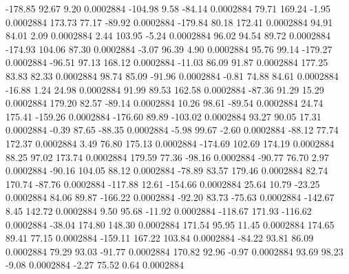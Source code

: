      -178.85       92.67        9.20     0.0002884
     -104.98        9.58      -84.14     0.0002884
       79.71      169.24       -1.95     0.0002884
      173.73       77.17      -89.92     0.0002884
     -179.84       80.18      172.41     0.0002884
       94.91       84.01        2.09     0.0002884
        2.44      103.95       -5.24     0.0002884
       96.02       94.54       89.72     0.0002884
     -174.93      104.06       87.30     0.0002884
       -3.07       96.39        4.90     0.0002884
       95.76       99.14     -179.27     0.0002884
      -96.51       97.13      168.12     0.0002884
      -11.03       86.09       91.87     0.0002884
      177.25       83.83       82.33     0.0002884
       98.74       85.09      -91.96     0.0002884
       -0.81       74.88       84.61     0.0002884
      -16.88        1.24       24.98     0.0002884
       91.99       89.53      162.58     0.0002884
      -87.36       91.29       15.29     0.0002884
      179.20       82.57      -89.14     0.0002884
       10.26       98.61      -89.54     0.0002884
       24.74      175.41     -159.26     0.0002884
     -176.60       89.89     -103.02     0.0002884
       93.27       90.05       17.31     0.0002884
       -0.39       87.65      -88.35     0.0002884
       -5.98       99.67       -2.60     0.0002884
      -88.12       77.74      172.37     0.0002884
        3.49       76.80      175.13     0.0002884
     -174.69      102.69      174.19     0.0002884
       88.25       97.02      173.74     0.0002884
      179.59       77.36      -98.16     0.0002884
      -90.77       76.70        2.97     0.0002884
      -90.16      104.05       88.12     0.0002884
      -78.89       83.57      179.46     0.0002884
       82.74      170.74      -87.76     0.0002884
     -117.88       12.61     -154.66     0.0002884
       25.64       10.79      -23.25     0.0002884
       84.06       89.87     -166.22     0.0002884
      -92.20       83.73      -75.63     0.0002884
     -142.67        8.45      142.72     0.0002884
        9.50       95.68      -11.92     0.0002884
     -118.67      171.93     -116.62     0.0002884
      -38.04      174.80      148.30     0.0002884
      171.54       95.95       11.45     0.0002884
      174.65       89.41       77.15     0.0002884
     -159.11      167.22      103.84     0.0002884
      -84.22       93.81       86.09     0.0002884
       79.29       93.03      -91.77     0.0002884
      170.82       92.96       -0.97     0.0002884
       93.69       98.23       -9.08     0.0002884
       -2.27       75.52        0.64     0.0002884
